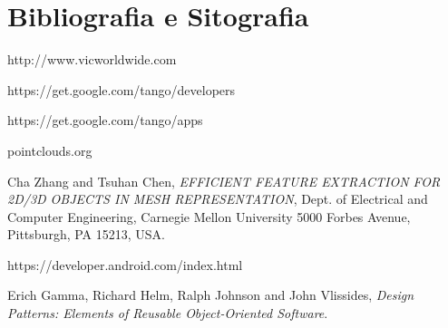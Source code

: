 

\cleardoublepage
\chapter{Bibliografia e Sitografia}

%

\begin{thebibliography}{9}

	http://www.vicworldwide.com

	https://get.google.com/tango/developers

	https://get.google.com/tango/apps

	pointclouds.org
	
	Cha Zhang and Tsuhan Chen,
	\emph{EFFICIENT FEATURE EXTRACTION FOR 2D/3D OBJECTS IN MESH REPRESENTATION},
	Dept. of Electrical and Computer Engineering, Carnegie Mellon University 5000 Forbes Avenue, Pittsburgh, PA 15213, USA.

	https://developer.android.com/index.html


	Erich Gamma, Richard Helm, Ralph Johnson and John Vlissides,
	\emph{Design Patterns: Elements of Reusable Object-Oriented Software}.
	

\end{thebibliography}